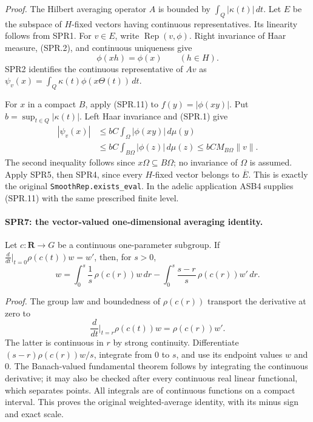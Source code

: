 \documentclass[11pt,a4paper]{article}
\numberwithin{equation}{section}
\theoremstyle{remark}\newtheorem{remark}[theorem]{Remark}
\begin{document}
\emph{Proof.}
The Hilbert averaging operator \(A\) is bounded by
\(\int_Q|\kappa(t)|\,dt\).
Let \(E\) be the subspace of \(H\)-fixed vectors having continuous
representatives.  Its linearity follows from SPR1.
For \(v\in E\), write \(\operatorname{Rep}(v,\phi)\).
Right invariance of Haar measure, (SPR.2), and continuous
uniqueness give
\[
                         \phi(xh)=\phi(x)\qquad(h\in H).
 \tag{SPR.13}
\]
SPR2 identifies the continuous representative of \(Av\) as
\(\psi_v(x)=\int_Q\kappa(t)\phi(x\Theta(t))\,dt\).

For \(x\) in a compact \(B\), apply (SPR.11) to
\(f(y)=|\phi(xy)|\).  Put
\(b=\sup_{t\in Q}|\kappa(t)|\).  Left Haar invariance and (SPR.1)
give
\[
\begin{split}
 |\psi_v(x)|
 &\le bC\int_\Omega|\phi(xy)|\,d\mu(y)\\
 &\le bC\int_{B\Omega}|\phi(z)|\,d\mu(z)
 \le bC M_{B\Omega}\|v\|.
\end{split}
\tag{SPR.14}
\]
The second inequality follows since \(x\Omega\subseteq B\Omega\);
no invariance of \(\Omega\) is assumed.
Apply SPR5, then SPR4, since every \(H\)-fixed vector belongs to
\(\overline E\).  This is exactly the original
\texttt{SmoothRep.\allowbreak exists\_\allowbreak eval}.  In the adelic application ASB4
supplies (SPR.11) with the same prescribed finite level.

\paragraph{SPR7: the vector-valued one-dimensional averaging identity.}
\label{claim:SPR7}
Let \(c:\mathbf R\to G\) be a continuous one-parameter subgroup.
If
\(\frac{d}{dt}|_{t=0}\rho(c(t))w=w'\), then, for \(s>0\),
\[
 w=\int_0^s\frac1s\,\rho(c(r))w\,dr
       -\int_0^s\frac{s-r}{s}\,\rho(c(r))w'\,dr.
 \tag{SPR.15}
\]

\emph{Proof.}
The group law and boundedness of \(\rho(c(r))\) transport the
derivative at zero to
\[
 \frac{d}{dt}\bigg|_{t=r}\rho(c(t))w=\rho(c(r))w'.
\]
The latter is continuous in \(r\) by strong continuity.
Differentiate
\((s-r)\rho(c(r))w/s\), integrate from \(0\) to \(s\), and use
its endpoint values \(w\) and \(0\).
The Banach-valued fundamental theorem follows by integrating
the continuous derivative; it may also be checked after every
continuous real linear functional, which separates points.
All integrals are of continuous functions on a compact interval.
This proves the original weighted-average identity, with its
minus sign and exact scale.
\end{document}
